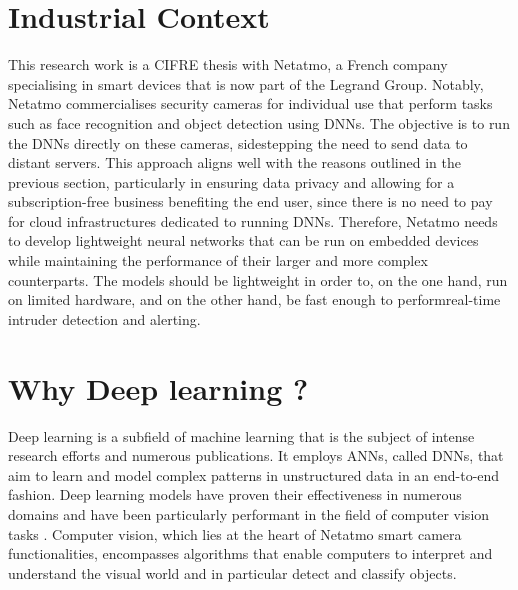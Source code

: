 \section{Industrial Context}


This research work is a CIFRE thesis with Netatmo, a French company specialising
in smart devices that is now part of the Legrand Group. Notably, Netatmo
commercialises security cameras for individual use that perform tasks such as
face recognition and object detection using \acp{DNN}. The objective is to run
the \acp{DNN} directly on these cameras, sidestepping the need to send data to
distant servers. This approach aligns well with the reasons outlined in the
previous section, particularly in ensuring data privacy and allowing for a
subscription-free business benefiting the end user, since there is no need to
pay for cloud infrastructures dedicated to running \acp{DNN}. Therefore, Netatmo
needs to develop lightweight neural networks that can be run on embedded devices
while maintaining the performance of their larger and more complex counterparts.
The models should be lightweight in order to, on the one hand, run on limited
hardware, and on the other hand, be fast enough to perform\DIFaddbegin {}\DIFaddend real-time intruder detection and alerting.\\

\section{Why Deep learning ?}

Deep learning is a subfield of machine learning that is the subject of intense
research efforts and numerous publications. It employs \aclp{ANN}, called
\acfp{DNN}, that aim to learn and model complex patterns in unstructured data in
an end-to-end fashion. Deep learning models have proven their effectiveness in
numerous domains and have been particularly performant in the field of computer
vision tasks
\cite{DBLP:conf/cvpr/HeZRS16,DBLP:conf/nips/RenHGS15,DBLP:conf/eccv/LiuAESRFB16}.
Computer vision, which lies at the heart of Netatmo smart camera
functionalities, encompasses algorithms that enable computers to interpret and
understand the visual world and in particular detect and classify objects.\\

